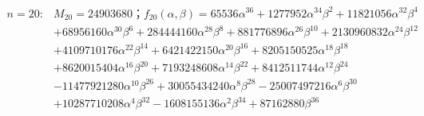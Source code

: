 \begin{flushleft}
\begin{align*}
n=20:&M_{20}=24903680；f_{20}(\alpha,\beta)=65536\alpha^{36}+1277952\alpha^{34}\beta^2+11821056\alpha^{32}\beta^4\\ 
&+68956160\alpha^{30}\beta^6+284444160\alpha^{28}\beta^{8}+881776896\alpha^{26}\beta^{10}+2130960832\alpha^{24}\beta^{12}\\ 
&+4109710176\alpha^{22}\beta^{14}+6421422150\alpha^{20}\beta^{16}+8205150525\alpha^{18}\beta^{18}\\ 
&+8620015404\alpha^{16}\beta^{20}+7193248608\alpha^{14}\beta^{22}+8412511744\alpha^{12}\beta^{24}\\ 
&-11477921280\alpha^{10}\beta^{26}+30055434240\alpha^8\beta^{28}-25007497216\alpha^6\beta^{30}\\ &+10287710208\alpha^4\beta^{32}-1608155136\alpha^2\beta^{34}+87162880\beta^{36}\\
\end{align*}
\end{flushleft}
\newpage

